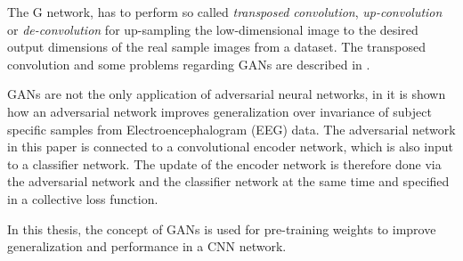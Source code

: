 The G network, has to perform so called \emph{transposed convolution}, \emph{up-convolution} or \emph{de-convolution} for up-sampling the low-dimensional image to the desired output dimensions of the real sample images from a dataset.
The transposed convolution and some problems regarding GANs are described in \cite{Durall2020}.

GANs are not the only application of adversarial neural networks, in \cite{Oezdenizci2020} it is shown how an adversarial network improves generalization over invariance of subject specific samples from Electroencephalogram (EEG) data.
The adversarial network in this paper is connected to a convolutional encoder network, which is also input to a classifier network.
The update of the encoder network is therefore done via the adversarial network and the classifier network at the same time and specified in a collective loss function.

In this thesis, the concept of GANs is used for pre-training weights to improve generalization and performance in a CNN network.
